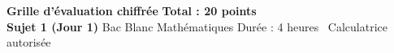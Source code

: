 \documentclass[a4paper,11pt]{article}
\begin{document}
\begin{tcolorbox}[
    enhanced,
    colback=bleufond,
    colframe=bleuprimaire,
    arc=1.6mm,
    boxrule=0.8pt,
    top=4pt, bottom=4pt, left=8pt, right=8pt
]
    \textbf{\Large\textcolor{bleuprimaire}{Grille d'évaluation chiffrée}} \hfill \textbf{\Large\textcolor{bleuprimaire}{Total : 20 points}} \\[0.15em]
    \textbf{\textcolor{bleusecondaire}{Sujet 1 (Jour 1)}} \hspace{0.2cm}\textcolor{grisaccent}{\textbullet}\hspace{0.2cm} \textcolor{grisaccent}{Bac Blanc Mathématiques} \hfill \small\textcolor{grisaccent}{Durée : 4 heures \textbullet\ Calculatrice autorisée}
\end{tcolorbox}

\vspace{0.10cm}
\end{document}
